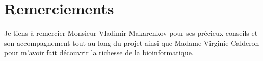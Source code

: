 \chapter*{Remerciements}
Je tiens à remercier Monsieur Vladimir Makarenkov pour ses précieux conseils et son accompagnement tout au long du projet ainsi que Madame Virginie Calderon pour m'avoir fait découvrir la richesse de la bioinformatique.
